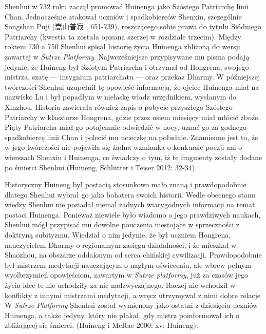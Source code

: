 Shenhui w 732 roku zaczął promować Huinenga jako Szóstego Patriarchę linii Chan.
Jednocześnie atakował uczniów i spadkobierców Shenxiu, szczególnie Songshan Puji (嵩山普寂 , 651-739), roszczącego sobie prawa do tytułu Siódmego Patriarchy (kwestia ta została opisana szerzej w rozdziale trzecim).
Między rokiem 730 a 750 Shenhui spisał historię życia Huinenga zbliżoną do wersji zawartej w \textit{Sutrze Platformy}.
Najwcześniejsze przypisywane mu pisma podają jedynie, że Huineng był Szóstym Patriarchą i otrzymał od Hongrena, swojego mistrza, szatę --- insygnium patriarchatu --- oraz przekaz Dharmy.
W późniejszej twórczości Shenhui uzupełnił tę opowieść informacją, że ojciec Huinenga miał na nazwisko Lu i był popadłym w niełaskę władz urzędnikiem, wysłanym do Xinzhou.
Historia zawierała również zapis o pobycie przyszłego Szóstego Patriarchy w klasztorze Hongrena, gdzie przez osiem miesięcy miał młócić zboże.
Piąty Patriarcha miał go potajemnie odwiedzić w nocy, uznać go za godnego spadkobiercę linii Chan i polecić mu ucieczkę na południe.
Znamienne jest to, że w jego twórczości nie pojawiła się żadna wzmianka o konkursie poezji ani o wierszach Shenxiu i Huinenga, co świadczy o tym, iż te fragmenty zostały dodane po śmierci Shenhui
(Huineng, Schlütter i Teiser 2012: 32-34).

Historyczny Huineng był postacią stosunkowo mało znaną i prawdopodobnie dlatego Shenhui wybrał go jako bohatera swoich historii.
Wedle obecnego stanu wiedzy Shenhui nie posiadał niemal żadnych wiarygodnych informacji na temat postaci Huinenga.
Ponieważ niewiele było wiadomo o jego prawdziwych naukach, Shenhui mógł przypisać mu dowolne pouczenia niestojące w sprzeczności z doktryną subityzmu.
Wiedział o nim jedynie, że był uczniem Hongrena, nauczycielem Dharmy o regionalnym zasięgu działalności, i że mieszkał w Shaozhou, na obszarze oddalonym od serca chińskiej cywilizacji.
Prawdopodobnie był mistrzem medytacji nauczającym o nagłym oświeceniu, ale wbrew pełnym wyolbrzymień opowieściom, zawartym w \textit{Sutrze platformy}, już za czasów jego życia idee te nie uchodziły za nic nadzwyczajnego.
Raczej nie wchodził w konflikty z innymi mistrzami medytacji, a wręcz utrzymywał z nimi dobre relacje
W \textit{Sutrze Platformy} Shenhui został wymienony jako ostatni z dziesięciu uczniów Huinenga, a także jedyny, który nie płakał, gdy mistrz poinformował ich o zbliżającej się śmierci.
(Huineng i McRae 2000: xv; Huineng).

